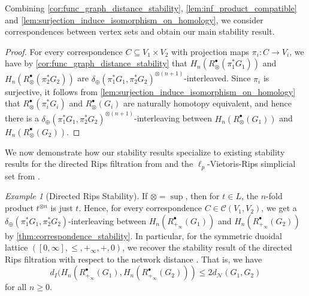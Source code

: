 \documentclass[a4paper,11pt]{article}
\newcommand{\tensor}{\otimes}
\newcommand{\atensor}{\oplus}
\newcounter{dummy}\numberwithin{dummy}{section}
\theoremstyle{remark}
\newtheorem{example}[dummy]{Example}
\begin{document}
Combining \cref{cor:func_graph_distance_stability}, \cref{lem:inf_product_compatible} and \cref{lem:surjection_induce_isomorphism_on_homology}, we consider correspondences between vertex sets and obtain our main stability result. 

\correspondencestability
\begin{proof}
    For every correspondence $C\subseteq V_1\times V_2$ with projection maps $\pi_i\colon C\to V_i$, we have by \cref{cor:func_graph_distance_stability} that $H_n(R_\tensor^\bullet(\pi_1^*G_1))$ and $H_n(R_\tensor^\bullet(\pi_2^*G_2))$ are $\delta_\atensor(\pi_1^*G_1,\pi_2^*G_2)^{\tensor (n+1)}$-interleaved. Since $\pi_i$ is surjective, it follows from \cref{lem:surjection_induce_isomorphism_on_homology} that $R_\tensor^\bullet(\pi_i^*G_i)$ and  $R_\tensor^\bullet(G_i)$ are naturally homotopy equivalent, and hence there is a $\delta_\atensor(\pi_1^*G_1,\pi_2^*G_2)^{\tensor (n+1)}$-interleaving between $H_n(R_\tensor^\bullet(G_1))$ and $H_n(R_\tensor^\bullet(G_2))$.
\end{proof}

We now demonstrate how our stability results specialize to existing stability results for the directed Rips filtration from \cite{turner2019rips} and the $\ell_p$-Vietoris-Rips simplicial set from \cite{ivanov2024ell_p}.

\begin{example}[Directed Rips Stability]\label{ex:directed_rips_stability}
If $\tensor=\sup$, then for $t\in L$, the $n$-fold product $t^{\tensor n}$ is just $t$. Hence, for every correspondence $C\in\mathcal{C}(V_1,V_2)$, we get a $\delta_\atensor(\pi_1^*G_1,\pi_2^*G_2)$-interleaving between $H_n(R^\bullet_{+_\infty}(G_1))$ and $H_n(R^\bullet_{+_\infty}(G_2))$ by \cref{thm:correspondence_stability}. In particular, for the symmetric duoidal lattice $([0,\infty],\leq,+_\infty,+,0)$, 
we recover the stability result of the directed Rips filtration with respect to the network distance \cite[Theorem~21]{turner2019rips}. That is, we have
\begin{equation*}
    d_I(H_n(R^\bullet_{+_\infty}(G_1),H_n(R^\bullet_{+_\infty}(G_2)))\leq 2d_\mathcal{N}(G_1,G_2)
\end{equation*}
for all $n\geq 0$.
\end{example}
\end{document}
